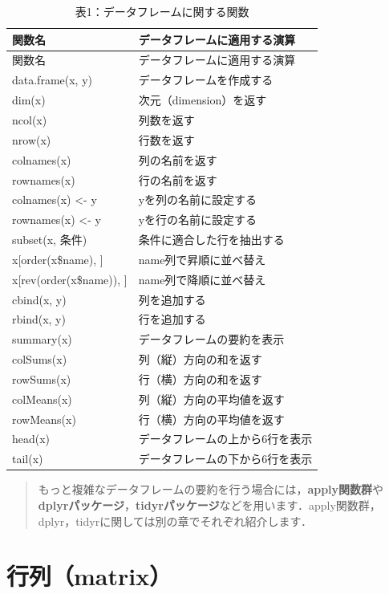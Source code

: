 \documentclass[
  letterpaper,
  DIV=11,
  numbers=noendperiod]{scrreprt}
\begin{document}
\begin{longtable}[]{@{}ll@{}}
\caption{表1：データフレームに関する関数}\tabularnewline
\toprule()
関数名 & データフレームに適用する演算 \\
\midrule()
\endfirsthead
\toprule()
関数名 & データフレームに適用する演算 \\
\midrule()
\endhead
data.frame(x, y) & データフレームを作成する \\
dim(x) & 次元（dimension）を返す \\
ncol(x) & 列数を返す \\
nrow(x) & 行数を返す \\
colnames(x) & 列の名前を返す \\
rownames(x) & 行の名前を返す \\
colnames(x) \textless- y & yを列の名前に設定する \\
rownames(x) \textless- y & yを行の名前に設定する \\
subset(x, 条件) & 条件に適合した行を抽出する \\
x{[}order(x\$name), {]} & name列で昇順に並べ替え \\
x{[}rev(order(x\$name)), {]} & name列で降順に並べ替え \\
cbind(x, y) & 列を追加する \\
rbind(x, y) & 行を追加する \\
summary(x) & データフレームの要約を表示 \\
colSums(x) & 列（縦）方向の和を返す \\
rowSums(x) & 行（横）方向の和を返す \\
colMeans(x) & 列（縦）方向の平均値を返す \\
rowMeans(x) & 行（横）方向の平均値を返す \\
head(x) & データフレームの上から6行を表示 \\
tail(x) & データフレームの下から6行を表示 \\
\bottomrule()
\end{longtable}

\begin{quote}
もっと複雑なデータフレームの要約を行う場合には，\textbf{apply関数群}や\textbf{dplyrパッケージ}，\textbf{tidyrパッケージ}などを用います．apply関数群，dplyr，tidyrに関しては別の章でそれぞれ紹介します．
\end{quote}

\hypertarget{ux884cux5217matrix-1}{%
\section{行列（matrix）}\label{ux884cux5217matrix-1}}
\end{document}
